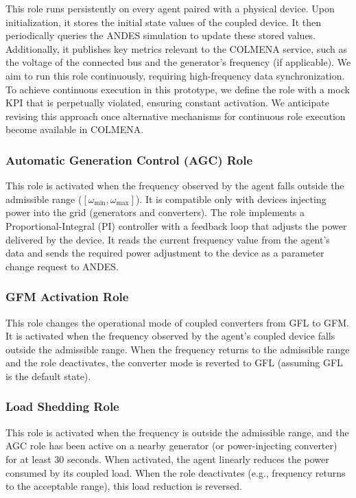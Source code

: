 \documentclass{article}
\begin{document}
This role runs persistently on every agent paired with a physical device. Upon initialization, it stores the initial state values of the coupled device. It then periodically queries the ANDES simulation to update these stored values. Additionally, it publishes key metrics relevant to the COLMENA service, such as the voltage of the connected bus and the generator's frequency (if applicable). We aim to run this role continuously, requiring high-frequency data synchronization. To achieve continuous execution in this prototype, we define the role with a mock KPI that is perpetually violated, ensuring constant activation. We anticipate revising this approach once alternative mechanisms for continuous role execution become available in COLMENA.

\subsubsection*{Automatic Generation Control (AGC) Role}

This role is activated when the frequency observed by the agent falls outside the admissible range ($[\omega_{\min}, \omega_{\max}]$). It is compatible only with devices injecting power into the grid (generators and converters). The role implements a Proportional-Integral (PI) controller with a feedback loop that adjusts the power delivered by the device. It reads the current frequency value from the agent's data and sends the required power adjustment to the device as a parameter change request to ANDES.

\subsubsection*{GFM Activation Role}

This role changes the operational mode of coupled converters from GFL to GFM. It is activated when the frequency observed by the agent's coupled device falls outside the admissible range. When the frequency returns to the admissible range and the role deactivates, the converter mode is reverted to GFL (assuming GFL is the default state).

\subsubsection*{Load Shedding Role}

This role is activated when the frequency is outside the admissible range, and the AGC role has been active on a nearby generator (or power-injecting converter) for at least 30 seconds. When activated, the agent linearly reduces the power consumed by its coupled load. When the role deactivates (e.g., frequency returns to the acceptable range), this load reduction is reversed.
\end{document}
